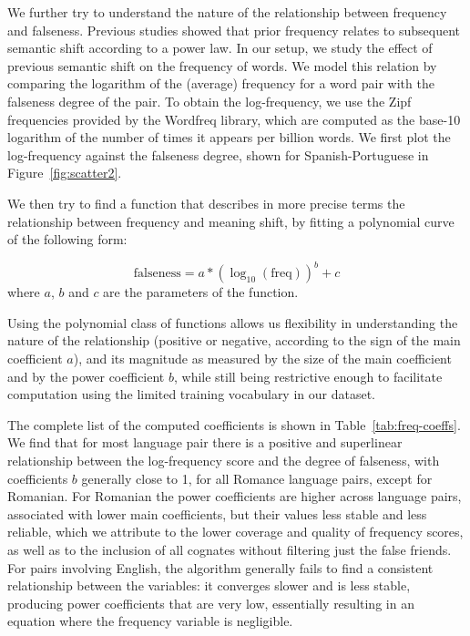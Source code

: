 \documentclass[output=paper]{langsci/langscibook}
\begin{document}
We further try to understand the nature of the relationship between frequency and falseness. Previous studies \citep{hamilton-etal-2016-diachronic} showed that prior frequency relates to subsequent semantic shift according to a power law. In our setup, we study the effect of previous semantic shift on the frequency of words. We model this relation by comparing the logarithm of the (average) frequency for a word pair with the falseness degree of the pair. To obtain the log-frequency, we use the Zipf frequencies provided by the Wordfreq library, which are computed as the base-10 logarithm of the number of times it appears per billion words. We first plot the log-frequency against the falseness degree, shown for Spanish-Portuguese in Figure~\ref{fig:scatter2}. 





We then try to find a function that describes in more precise terms the relationship between frequency and meaning shift, by fitting a polynomial curve of the following form:

\begin{equation}
    \text{falseness} = a * (\log_{10}(\text{freq}))^b + c
\end{equation}
where $a$, $b$ and $c$ are the parameters of the function. 

Using the polynomial class of functions allows us flexibility in understanding the nature of the relationship (positive or negative, according to the sign of the main coefficient $a$), and its magnitude as measured by the size of the main coefficient and by the power coefficient $b$, while still being restrictive enough to facilitate computation using the limited training vocabulary in our dataset.

The complete list of the computed coefficients is shown in Table~\ref{tab:freq-coeffs}. We find that for most language pair there is a positive and superlinear relationship between the log-frequency score and the degree of falseness, with coefficients $b$ generally close to 1, for all Romance language pairs, except for Romanian. For Romanian the power coefficients are higher across language pairs, associated with lower main coefficients, but their values less stable and less reliable, which we attribute to the lower coverage and quality of frequency scores, as well as to the inclusion of all cognates without filtering just the false friends. For pairs involving English, the algorithm generally fails to find a consistent relationship between the variables: it converges slower and is less stable, producing power coefficients that are very low, essentially resulting in an equation where the frequency variable is negligible.
\end{document}
